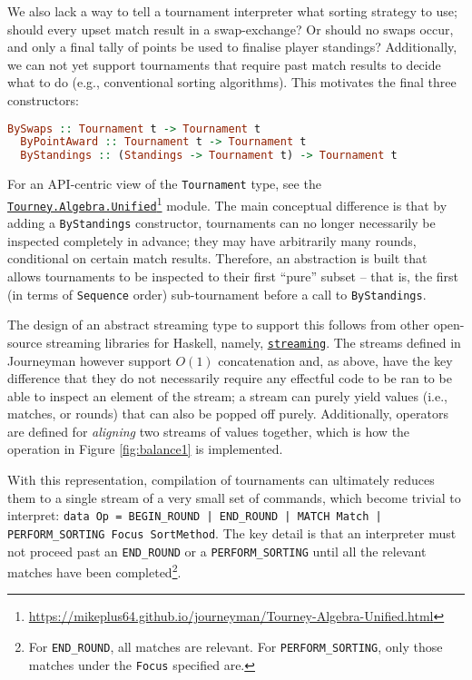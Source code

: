 \documentclass[a4,11pt,twoside,final,hidelinks]{article}
\begin{document}
We also lack a way to tell a tournament interpreter what sorting strategy to
use; should every upset match result in a swap-exchange? Or should no swaps
occur, and only a final tally of points be used to finalise player standings?
Additionally, we can not yet support tournaments that require past match results
to decide what to do (e.g., conventional sorting algorithms). This motivates the
final three constructors:

\begin{lstlisting}[language=haskell,numbers=none]
  BySwaps :: Tournament t -> Tournament t
  ByPointAward :: Tournament t -> Tournament t
  ByStandings :: (Standings -> Tournament t) -> Tournament t
\end{lstlisting}

For an API-centric view of the \texttt{Tournament} type, see the
\href{https://mikeplus64.github.io/journeyman/Tourney-Algebra-Unified.html}{ \texttt{Tourney.Algebra.Unified}}\footnote{\url{https://mikeplus64.github.io/journeyman/Tourney-Algebra-Unified.html}} module. The main conceptual difference is that by
adding a \texttt{ByStandings} constructor, tournaments can no longer necessarily be
inspected completely in advance; they may have arbitrarily many rounds,
conditional on certain match results. Therefore, an abstraction is built that
allows tournaments to be inspected to their first ``pure'' subset -- that is, the
first (in terms of \texttt{Sequence} order) sub-tournament before a call to
\texttt{ByStandings}.

The design of an abstract streaming type to support this follows from other
open-source streaming libraries for Haskell, namely, \href{https://hackage.haskell.org/package/streaming}{\texttt{streaming}}. The streams
defined in Journeyman however support \(O(1)\) concatenation and, as above, have
the key difference that they do not necessarily require any effectful code to be
ran to be able to inspect an element of the stream; a stream can purely yield
values (i.e., matches, or rounds) that can also be popped off purely.
Additionally, operators are defined for \emph{aligning} two streams of values
together, which is how the operation in Figure \ref{fig:balance1} is implemented.

\label{compiler} With this representation, compilation of tournaments can ultimately
reduces them to a single stream of a very small set of commands, which become
trivial to interpret: \texttt{data Op = BEGIN\_ROUND | END\_ROUND | MATCH Match |
PERFORM\_SORTING Focus SortMethod}. The key detail is that an interpreter must not
proceed past an \texttt{END\_ROUND} or a \texttt{PERFORM\_SORTING} until all the relevant matches
have been completed\footnote{For \texttt{END\_ROUND}, all matches are relevant. For
\texttt{PERFORM\_SORTING}, only those matches under the \texttt{Focus} specified are.}.
\end{document}
